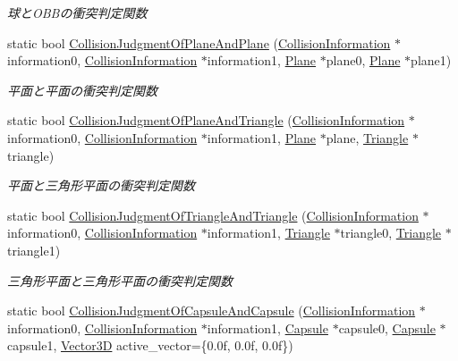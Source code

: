\begin{DoxyCompactItemize}
\begin{DoxyCompactList}\small\item\em 球と\+O\+B\+Bの衝突判定関数 \end{DoxyCompactList}\item 
static bool \mbox{\hyperlink{class_collision_calculation_a0bb34d752ed1d8c99c53b23cc993d9b9}{Collision\+Judgment\+Of\+Plane\+And\+Plane}} (\mbox{\hyperlink{class_collision_information}{Collision\+Information}} $\ast$information0, \mbox{\hyperlink{class_collision_information}{Collision\+Information}} $\ast$information1, \mbox{\hyperlink{class_plane}{Plane}} $\ast$plane0, \mbox{\hyperlink{class_plane}{Plane}} $\ast$plane1)
\begin{DoxyCompactList}\small\item\em 平面と平面の衝突判定関数 \end{DoxyCompactList}\item 
static bool \mbox{\hyperlink{class_collision_calculation_ad19f94f6453b26998c350f56385660e5}{Collision\+Judgment\+Of\+Plane\+And\+Triangle}} (\mbox{\hyperlink{class_collision_information}{Collision\+Information}} $\ast$information0, \mbox{\hyperlink{class_collision_information}{Collision\+Information}} $\ast$information1, \mbox{\hyperlink{class_plane}{Plane}} $\ast$plane, \mbox{\hyperlink{class_triangle}{Triangle}} $\ast$triangle)
\begin{DoxyCompactList}\small\item\em 平面と三角形平面の衝突判定関数 \end{DoxyCompactList}\item 
static bool \mbox{\hyperlink{class_collision_calculation_aec8a30c510c4d0e70f520262ff39453e}{Collision\+Judgment\+Of\+Triangle\+And\+Triangle}} (\mbox{\hyperlink{class_collision_information}{Collision\+Information}} $\ast$information0, \mbox{\hyperlink{class_collision_information}{Collision\+Information}} $\ast$information1, \mbox{\hyperlink{class_triangle}{Triangle}} $\ast$triangle0, \mbox{\hyperlink{class_triangle}{Triangle}} $\ast$triangle1)
\begin{DoxyCompactList}\small\item\em 三角形平面と三角形平面の衝突判定関数 \end{DoxyCompactList}\item 
static bool \mbox{\hyperlink{class_collision_calculation_a2d8f643a23a807211e58ffcc0161a015}{Collision\+Judgment\+Of\+Capsule\+And\+Capsule}} (\mbox{\hyperlink{class_collision_information}{Collision\+Information}} $\ast$information0, \mbox{\hyperlink{class_collision_information}{Collision\+Information}} $\ast$information1, \mbox{\hyperlink{class_capsule}{Capsule}} $\ast$capsule0, \mbox{\hyperlink{class_capsule}{Capsule}} $\ast$capsule1, \mbox{\hyperlink{class_vector3_d}{Vector3D}} active\+\_\+vector=\{0.\+0f, 0.\+0f, 0.\+0f\})

\end{DoxyCompactItemize}
